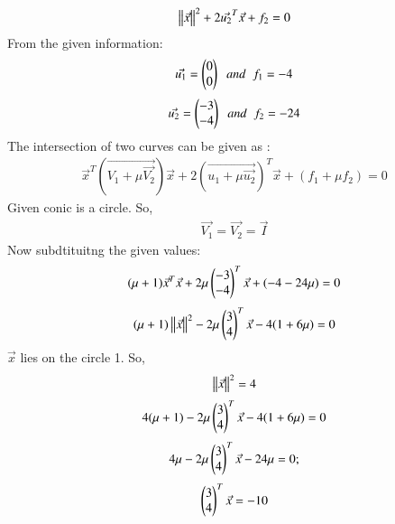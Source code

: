 \documentclass[journal]{IEEEtran}
\theoremstyle{remark}
\begin{document}
\begin{align}
  \left\lVert\Vec{x}\right\rVert^2+2\Vec{u_2}^T\Vec{x}+f_2=0
\end{align}
From the given information:
\begin{align}
\Vec{u_1}=\begin{pmatrix}0\\0\end{pmatrix}\;\;and\;\;f_1=-4
\end{align}
\begin{align}
\Vec{u_2}=\begin{pmatrix}-3\\-4\end{pmatrix}\;\;and\;\;f_2=-24
\end{align}
The intersection of two curves can be given as :
\begin{align}
\Vec{x}^T(\Vec{V_1+\mu\Vec{V_2}})\Vec{x}+2(\Vec{u_1+\mu\Vec{u_2}})^T\Vec{x}+(f_1+\mu f_2)=0
\end{align}
Given conic is a circle. So,
\begin{align}
    \Vec{V_1}=\Vec{V_2}=\Vec{I}
\end{align}
Now subdtituitng the given values:
\begin{align}
    (\mu +1)\Vec{x}^T\Vec{x}+2\mu\begin{pmatrix}-3\\-4\end{pmatrix}^T\Vec{x}+(-4-24\mu)=0
\end{align}
\begin{align}
    (\mu+1)\left\lVert\Vec{x}\right\rVert^2-2\mu\begin{pmatrix}3\\4\end{pmatrix}^T\Vec{x}-4(1+6\mu)=0
\end{align}
$\Vec{x}$ lies on the circle 1. So,
\begin{align}
    \left\lVert\Vec{x}\right\rVert^2=4
\end{align}
\begin{align}
    4(\mu +1)-2\mu\begin{pmatrix}3\\4\end{pmatrix}^T\Vec{x}-4(1+6\mu)=0
\end{align}
\begin{align}
    4\mu-2\mu\begin{pmatrix}3\\4\end{pmatrix}^T\Vec{x}-24\mu=0;
\end{align}
\begin{align}
    \begin{pmatrix}3\\4\end{pmatrix}^T\Vec{x}=-10
    \end{align}
\end{document}

